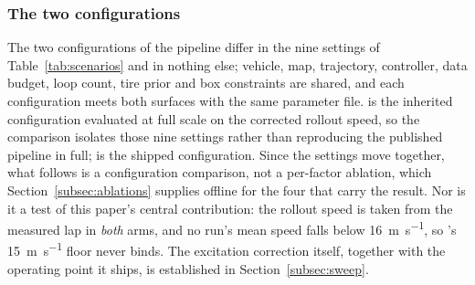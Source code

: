 \subsubsection{The two configurations}
\label{subsubsec:scenarios}
The two configurations of the pipeline differ in the nine settings of
Table~\ref{tab:scenarios} and in nothing else; vehicle, map, trajectory,
controller, data budget, loop count, tire prior and box constraints are shared,
and each configuration meets both surfaces with the same parameter file.
\basearm{} is the inherited configuration evaluated at full scale on the
corrected rollout speed, so the comparison isolates those nine settings rather
than reproducing the published pipeline in full; \oursarm{} is the shipped
configuration. Since the settings move together, what follows is a
configuration comparison, not a per-factor ablation, which
Section~\ref{subsec:ablations} supplies offline for the four that carry the
result. Nor is it a test of this paper's central contribution: the rollout
speed is taken from the measured lap in \emph{both} arms, and no run's mean
speed falls below \SI{16}{\meter\per\second}, so \oursarm{}'s
\SI{15}{\meter\per\second} floor never binds. The excitation correction itself,
together with the operating point it ships, is established in
Section~\ref{subsec:sweep}.

